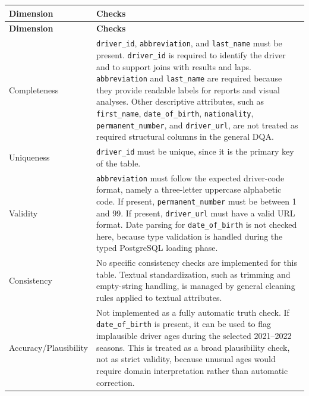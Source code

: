 \documentclass[a4paper,11pt]{article}
\begin{document}
	\begin{longtable}{p{3.5cm}p{11cm}}
		\toprule
		\textbf{Dimension} & \textbf{Checks} \\
		\midrule
		\endfirsthead
		
		\toprule
		\textbf{Dimension} & \textbf{Checks} \\
		\midrule
		\endhead
		
		Completeness
		& \texttt{driver\_id}, \texttt{abbreviation}, and \texttt{last\_name}
		must be present. \texttt{driver\_id} is required to identify the driver and
		to support joins with results and laps. \texttt{abbreviation} and
		\texttt{last\_name} are required because they provide readable labels for
		reports and visual analyses. Other descriptive attributes, such as
		\texttt{first\_name}, \texttt{date\_of\_birth}, \texttt{nationality},
		\texttt{permanent\_number}, and \texttt{driver\_url}, are not treated as
		required structural columns in the general DQA. \\
		\midrule
		
		Uniqueness
		& \texttt{driver\_id} must be unique, since it is the primary key of the table. \\
		\midrule
		
		Validity
		& \texttt{abbreviation} must follow the expected driver-code format, namely
		a three-letter uppercase alphabetic code. If present,
		\texttt{permanent\_number} must be between 1 and 99. If present,
		\texttt{driver\_url} must have a valid URL format. Date parsing for
		\texttt{date\_of\_birth} is not checked here, because type validation is
		handled during the typed PostgreSQL loading phase. \\
		\midrule
		
		Consistency
		& No specific consistency checks are implemented for this table. Textual
		standardization, such as trimming and empty-string handling, is managed by
		general cleaning rules applied to textual attributes. \\
		\midrule
		
		Accuracy/Plausibility
		& Not implemented as a fully automatic truth check. If
		\texttt{date\_of\_birth} is present, it can be used to flag implausible driver
		ages during the selected 2021--2022 seasons. This is treated as a broad
		plausibility check, not as strict validity, because unusual ages would require
		domain interpretation rather than automatic correction. \\
		\midrule
		
		\bottomrule
	\end{longtable}
\end{document}
